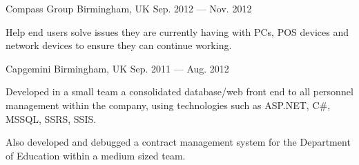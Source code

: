 \begin{cventries}
    {Compass Group} %
    {Birmingham, UK} %
    {Sep. 2012 — Nov. 2012} %
    {
	    \begin{cvitems} %
	    \item {Help end users solve issues they are currently having with PCs, POS devices and network devices to ensure they can continue working.}
	    \end{cvitems}
    }

    {Capgemini} %
    {Birmingham, UK} %
    {Sep. 2011 — Aug. 2012} %
    {
	    \begin{cvitems} %
	    \item {Developed in a small team a consolidated database/web front end to all personnel management within the company, using technologies such as ASP.NET, C\#, MSSQL, SSRS, SSIS.}
	    \item {Also developed and debugged a contract management system for the Department of Education within a medium sized team.}
	    \end{cvitems}
    }

\end{cventries}
